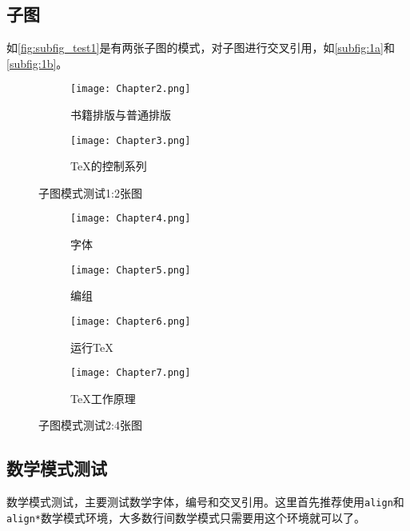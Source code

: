\subsection{子图}

如\autoref{fig:subfig_test1}是有两张子图的模式，对子图进行交叉引用，如\autoref{subfig:1a}和\autoref{subfig:1b}。

\begin{figure}[htbp]
	\centering
	\begin{subfigure}[b]{.4\textwidth}
		\centering
		\texttt{[image: Chapter2.png]}
		\caption{书籍排版与普通排版}\label{subfig:1a}
	\end{subfigure}
	\quad
	\begin{subfigure}[b]{.4\textwidth}
		\centering
		\texttt{[image: Chapter3.png]}
		\caption{\TeX 的控制系列}\label{subfig:1b}
	\end{subfigure}
	\caption{子图模式测试1:2张图}\label{fig:subfig_test1}
\end{figure}

\begin{figure}[htbp]
	\centering
	\begin{subfigure}[b]{.4\textwidth}
		\centering
		\texttt{[image: Chapter4.png]}
		\caption{字体}\label{subfig:2a}
	\end{subfigure}
	\begin{subfigure}[b]{.4\textwidth}
		\centering
		\texttt{[image: Chapter5.png]}
		\caption{编组}\label{subfig:2b}
	\end{subfigure}
	\begin{subfigure}[b]{.4\textwidth}
		\centering
		\texttt{[image: Chapter6.png]}
		\caption{运行\TeX}\label{subfig:2c}
	\end{subfigure}
	\begin{subfigure}[b]{.4\textwidth}
		\centering
		\texttt{[image: Chapter7.png]}
		\caption{\TeX 工作原理}\label{subfig:2d}
	\end{subfigure}
	\caption{子图模式测试2:4张图}\label{fig:subfig_test2}
\end{figure}

\subsection{数学模式测试}
数学模式测试，主要测试数学字体，编号和交叉引用。这里首先推荐使用\texttt{align}和\texttt{align*}数学模式环境，大多数行间数学模式只需要用这个环境就可以了。

